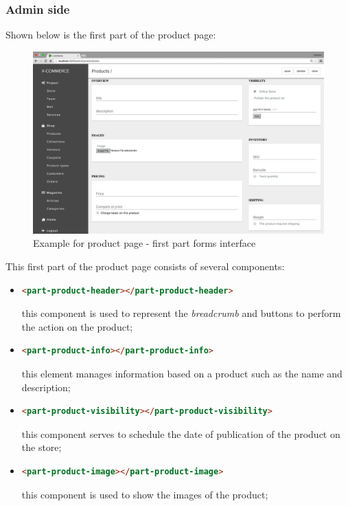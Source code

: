 \subsubsection{Admin side}
Shown below is the first part of the product page:
\begin{figure}[htb]
\centering
\includegraphics[width=1.0\linewidth]{images/chapter4/product-page-ex1.png}\hfill
\caption[Product page first part form]{Example for product page - first part forms interface}
\label{fig:design_page}
\end{figure}
\newline
This first part of the product page consists of several components:
\begin{itemize}
\item
\begin{lstlisting}[language=html]
<part-product-header></part-product-header>
\end{lstlisting}
this component is used to represent the \emph{breadcrumb} and buttons to perform the action on the product;
\item
\begin{lstlisting}[language=html]
<part-product-info></part-product-info>
\end{lstlisting}
this element manages information based on a product such as the name and description;
\item
\begin{lstlisting}[language=html]
<part-product-visibility></part-product-visibility>
\end{lstlisting}
this component serves to schedule the date of publication of the product on the store;
\item
\begin{lstlisting}[language=html]
<part-product-image></part-product-image>
\end{lstlisting}
this component is used to show the images of the product;
\end{itemize}
